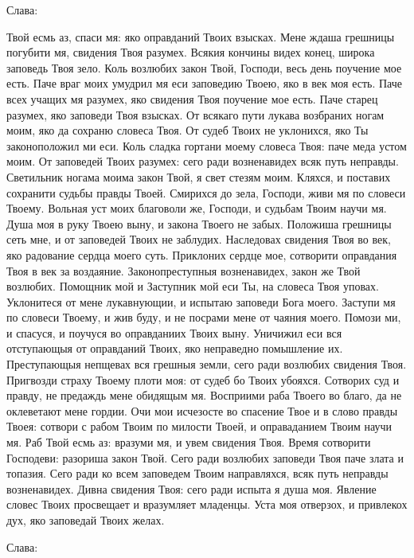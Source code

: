 Слава: 

Твой есмь аз, спаси мя: яко оправданий Твоих взысках. Мене ждаша грешницы погубити мя, свидения Твоя разумех. Всякия кончины видех конец, широка заповедь Твоя зело. Коль возлюбих закон Твой, Господи, весь день поучение мое есть. Паче враг моих умудрил мя еси заповедию Твоею, яко в век моя есть. Паче всех учащих мя разумех, яко свидения Твоя поучение мое есть. Паче старец разумех, яко заповеди Твоя взысках. От всякаго пути лукава возбраних ногам моим, яко да сохраню словеса Твоя. От судеб Твоих не уклонихся, яко Ты законоположил ми еси. Коль сладка гортани моему словеса Твоя: паче меда устом моим. От заповедей Твоих разумех: сего ради возненавидех всяк путь неправды. Светильник ногама моима закон Твой, я свет стезям моим. Кляхся, и поставих сохранити судьбы правды Твоей. Смирихся до зела, Господи, живи мя по словеси Твоему. Вольная уст моих благоволи же, Господи, и судьбам Твоим научи мя. Душа моя в руку Твоею выну, и закона Твоего не забых. Положиша грешницы сеть мне, и от заповедей Твоих не заблудих. Наследовах свидения Твоя во век, яко радование сердца моего суть. Приклоних сердце мое, сотворити оправдания Твоя в век за воздаяние. Законопреступныя возненавидех, закон же Твой возлюбих. Помощник мой и Заступник мой еси Ты, на словеса Твоя уповах. Уклонитеся от мене лукавнующии, и испытаю заповеди Бога моего. Заступи мя по словеси Твоему, и жив буду, и не посрами мене от чаяния моего. Помози ми, и спасуся, и поучуся во оправданиих Твоих выну. Уничижил еси вся отступающыя от оправданий Твоих, яко неправедно помышление их. Преступающыя непщевах вся грешныя земли, сего ради возлюбих свидения Твоя. Пригвозди страху Твоему плоти моя: от судеб бо Твоих убояхся. Сотворих суд и правду, не предаждь мене обидящым мя. Восприими раба Твоего во благо, да не оклеветают мене гордии. Очи мои исчезосте во спасение Твое и в слово правды Твоея: сотвори с рабом Твоим по милости Твоей, и оправаданием Твоим научи мя. Раб Твой есмь аз: вразуми мя, и увем свидения Твоя. Время сотворити Господеви: разориша закон Твой. Сего ради возлюбих заповеди Твоя паче злата и топазия. Сего ради ко всем заповедем Твоим направляхся, всяк путь неправды возненавидех. Дивна свидения Твоя: сего ради испыта я душа моя. Явление словес Твоих просвещает и вразумляет младенцы. Уста моя отверзох, и привлекох дух, яко заповедай Твоих желах. 

Слава: 


